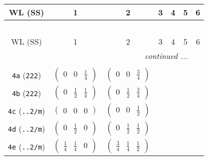 \documentclass[fleqn,9pt,landscape]{jsarticle}
\begin{document}
\begin{center}
\renewcommand{\arraystretch}{1.2}
\begin{longtable}{ccccccc}
 \hline \hline
WL (SS) & 1 & 2 & 3 & 4 & 5 & 6 \\ \hline \endfirsthead

\multicolumn{6}{l}{\tablename\ \thetable{}} \\
 \hline \hline
WL (SS) & 1 & 2 & 3 & 4 & 5 & 6 \\ \hline \endhead

 \hline \hline
\multicolumn{6}{r}{\footnotesize\it continued ...} \\ \endfoot

 \hline \hline
\multicolumn{6}{r}{} \\ \endlastfoot

{\tt 4a} ({\tt 222}) & $ \begin{pmatrix} 0 & 0 & \frac{1}{4} \end{pmatrix} $ & $ \begin{pmatrix} 0 & 0 & \frac{3}{4} \end{pmatrix} $ & $  $ & $  $ & $  $ & $  $ \\ \hline
{\tt 4b} ({\tt 222}) & $ \begin{pmatrix} 0 & \frac{1}{2} & \frac{1}{4} \end{pmatrix} $ & $ \begin{pmatrix} 0 & \frac{1}{2} & \frac{3}{4} \end{pmatrix} $ & $  $ & $  $ & $  $ & $  $ \\ \hline
{\tt 4c} ({\tt ..2/m}) & $ \begin{pmatrix} 0 & 0 & 0 \end{pmatrix} $ & $ \begin{pmatrix} 0 & 0 & \frac{1}{2} \end{pmatrix} $ & $  $ & $  $ & $  $ & $  $ \\ \hline
{\tt 4d} ({\tt ..2/m}) & $ \begin{pmatrix} 0 & \frac{1}{2} & 0 \end{pmatrix} $ & $ \begin{pmatrix} 0 & \frac{1}{2} & \frac{1}{2} \end{pmatrix} $ & $  $ & $  $ & $  $ & $  $ \\ \hline
{\tt 4e} ({\tt ..2/m}) & $ \begin{pmatrix} \frac{1}{4} & \frac{1}{4} & 0 \end{pmatrix} $ & $ \begin{pmatrix} \frac{3}{4} & \frac{1}{4} & \frac{1}{2} \end{pmatrix} $ & $  $ & $  $ & $  $ & $  $ \\ \hline

\end{longtable}
\end{center}
\end{document}
